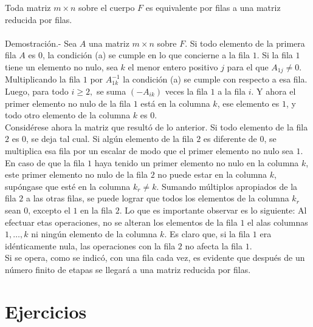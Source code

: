 \begin{teo}
    Toda matriz $m\times n$ sobre el cuerpo $F$ es equivalente por filas a una matriz reducida por filas.\\\\
    Demostración.-\; Sea $A$ una matriz $m\times n$ sobre $F$. Si todo elemento de la primera fila $A$ es $0$, la condición (a) se cumple en lo que concierne a la fila $1$. Si la fila $1$ tiene un elemento no nulo, sea $k$ el menor entero positivo $j$ para el que $A_{1j}\neq 0$. Multiplicando la fila $1$ por $A_{1k}^{-1}$ la condición (a) se cumple con respecto a esa fila. Luego, para todo $i\geq 2,$ se suma $(-A_{ik})$ veces la fila $1$  a la fila $i$. Y ahora el primer elemento no nulo de la fila $1$ está en la columna $k$, ese elemento es $1$, y todo otro elemento de la columna $k$ es $0$.\\
    Considérese ahora la matriz que resultó de lo anterior. Si todo elemento de la fila $2$ es $0$, se deja tal cual. Si algún elemento de la fila $2$ es diferente de $0$, se multiplica esa fila por un escalar de modo que el primer elemento no nulo sea $1$. En caso de que la fila $1$ haya tenido un primer elemento no nulo en la columna $k$, este primer elemento no nulo de la fila $2$ no puede estar en la columna $k$, supóngase que esté en la columna $k_r\neq k$. Sumando múltiplos apropiados de la fila $2$ a las otras filas, se puede lograr que todos los elementos de la columna $k_r$ sean $0$, excepto el $1$ en la fila $2$. Lo que es importante observar es lo siguiente: Al efectuar etas operaciones, no se alteran los elementos de la fila $1$ el alas columnas $1,\ldots, k$ ni ningún elemento de la columna $k$. Es claro que, si la fila $1$ era idénticamente nula, las operaciones con la fila $2$ no afecta la fila $1$.\\
    Si se opera, como se indicó, con una fila cada vez, es evidente que después de un número finito de etapas se llegará a una matriz reducida por filas.
\end{teo}

\section*{Ejercicios}


